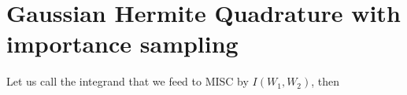 \documentclass[11pt]{article}
\begin{document}
%
%
%










\newpage

 




\appendix



\newpage
\section{Gaussian Hermite Quadrature with importance sampling}\label{appendix:Gaussian Hermite Quadrature with importance sampling}
Let us call the integrand that we feed to MISC by $I(W_1,W_2)$, then 
\end{document}
